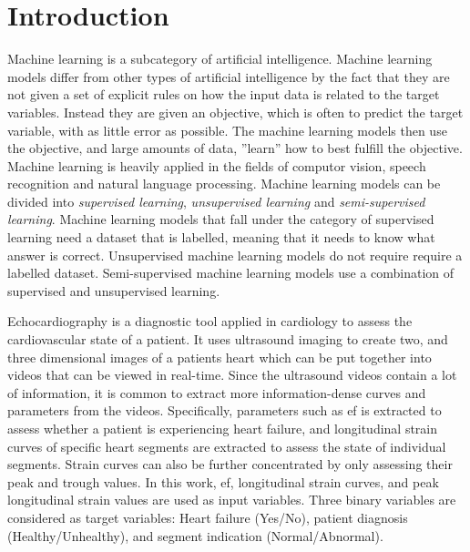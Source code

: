 \chapter{Introduction} \label{chap:intro}

Machine learning is a subcategory of artificial intelligence. Machine learning models differ from other types of artificial intelligence by the fact that they are not given a set of explicit rules on how the input data is related to the target variables. Instead they are given an objective, which is often to predict the target variable, with as little error as possible. The machine learning models then use the objective, and large amounts of data, ''learn'' how to best fulfill the objective. Machine learning is heavily applied in the fields of computor vision, speech recognition and natural language processing. Machine learning models can be divided into \textit{supervised learning}, \textit{unsupervised learning} and \textit{semi-supervised learning}. Machine learning models that fall under the category of supervised learning need a dataset that is labelled, meaning that it needs to know what answer is correct. Unsupervised machine learning models do not require require a labelled dataset. Semi-supervised machine learning models use a combination of supervised and unsupervised learning. \bigskip

Echocardiography is a diagnostic tool applied in cardiology to assess the cardiovascular state of a patient. It uses ultrasound imaging to create two, and three dimensional images of a patients heart which can be put together into videos that can be viewed in real-time. Since the ultrasound videos contain a lot of information, it is common to extract more information-dense curves and parameters from the videos. Specifically, parameters such as \acrfull{ef} is extracted to assess whether a patient is experiencing heart failure, and longitudinal strain curves of specific heart segments are extracted to assess the state of individual segments. Strain curves can also be further concentrated by only assessing their peak and trough values. In this work, \acrshort{ef}, longitudinal strain curves, and peak longitudinal strain values are used as input variables. Three binary variables are considered as target variables: Heart failure (Yes/No), patient diagnosis (Healthy/Unhealthy), and segment indication (Normal/Abnormal).

